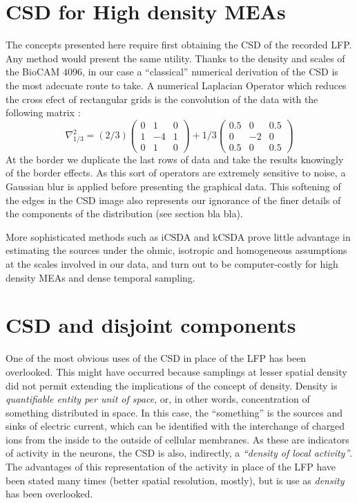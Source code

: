 \documentclass{article}
\begin{document}
\section{CSD for High density MEAs}

The concepts presented here require first obtaining the CSD of the recorded LFP. Any method would present the same utility. Thanks to the density and scales of the BioCAM 4096, in our case a ``classical'' numerical derivation of the CSD is the most adecuate route to take. A numerical Laplacian Operator which reduces the cross efect of rectangular grids is the convolution of the data with the following matrix \cite{Lindberg90}:
\begin{equation}
\nabla^2_{1/3}=(2/3)
\begin{pmatrix}
  0 & 1 & 0 \\
  1 & -4 & 1 \\
  0 & 1 & 0
\end{pmatrix}
+1/3
\begin{pmatrix}
  0.5 & 0 & 0.5 \\
  0 & -2 & 0 \\
  0.5 & 0 & 0.5
\end{pmatrix}  
\end{equation}
At the border we duplicate the last rows of data and take the results knowingly of the border effects. As this sort of operators are extremely sensitive to noise, a Gaussian blur is applied before presenting the graphical data. This softening of the edges in the CSD image also represents our ignorance of the finer details of the components of the distribution (see section bla bla).


More sophisticated methods such as iCSDA \cite{Leski2011} and kCSDA \cite{Potworowski2011} prove little advantage in estimating the sources under the ohmic, isotropic and homogeneous assumptions at the scales involved in our data, and turn out to be computer-costly for high density MEAs and dense temporal sampling. 



\section{CSD and disjoint components}

One of the most obvious uses of the CSD in place of the LFP has been overlooked. This might have occurred because  samplings at lesser spatial density did not permit extending the implications of the concept of density. Density is \emph{quantifiable entity per unit of space}, or, in other words, concentration of something distributed in space. In this case, the ``something'' is the sources and sinks of electric current, which can be identified with the interchange of charged ions from the inside to the outside of cellular membranes. As these are indicators of activity in the neurons, the CSD is also, indirectly, a \emph{``density of local activity''}. The advantages of this representation of the activity in place of the LFP have been stated many times (better spatial resolution, mostly), but is use as \emph{density} has been overlooked.
\end{document}
